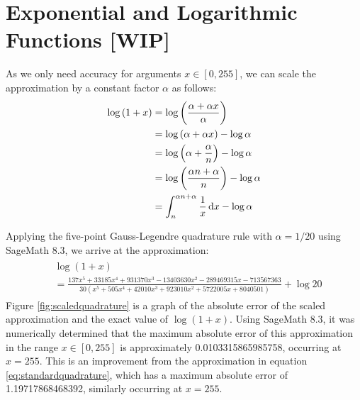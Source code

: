 \section{Exponential and Logarithmic Functions [WIP]}


As we only need accuracy for arguments $x \in [0, 255]$, we can scale the approximation by a constant factor $\alpha$ as follows:
\begin{align*}
  \log{(1+x)} &= \log{\left(\frac{\alpha + \alpha x}{\alpha}\right)}\\
  &= \log{(\alpha + \alpha x)} - \log{\alpha}\\
  &= \log{\left(\alpha+\frac{\alpha}{n}\right)} - \log{\alpha}\\
  &= \log{\left(\frac{\alpha n + \alpha}{n}\right)} - \log{\alpha}\\
  &= \int_{n}^{\alpha n + \alpha}{\frac{1}{x}\mathop{}\!\mathrm{d} x} - \log{\alpha}
\end{align*}

Applying the five-point Gauss-Legendre quadrature rule with $\alpha = 1/20$ using SageMath 8.3, we arrive at the approximation:
\begin{align}\label{eq:scaledquadrature}
  \begin{split}
    &\log(1+x) \\
    &=\frac{137x^5 + 33185x^4 + 931370x^3 - 13403630x^2 - 289469315x - 713567363}
    {30(x^5 + 505x^4 + 42010x^3 + 923010x^2 + 5722005x + 8040501)} + \log{20}
  \end{split}
\end{align}
Figure \ref{fig:scaledquadrature} is a graph of the absolute error of the scaled approximation and the exact value of $\log{(1+x)}$. Using SageMath 8.3, it was numerically determined that the maximum absolute error of this approximation in the range $x\in[0,255]$ is approximately 0.0103315865985758, occurring at $x=255$. This is an improvement from the approximation in equation \ref{eq:standardquadrature}, which has a maximum absolute error of 1.19717868468392, similarly occurring at $x=255$.


